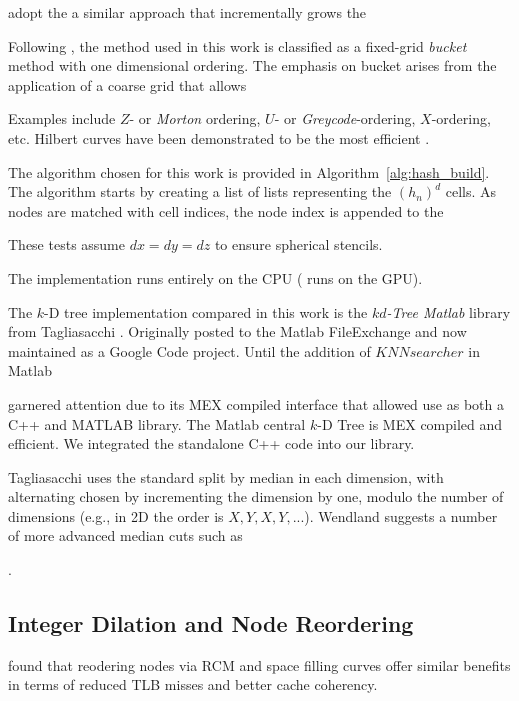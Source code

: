 \documentclass{report}
\begin{document}
\cite{Purcell2003} adopt the a similar approach that incrementally grows the 

Following \cite{Samet2005}, the method used in this work is classified as a fixed-grid \emph{bucket} method with one dimensional ordering. The emphasis on bucket arises from the application of a coarse grid that allows 

 Examples include $Z$- or \emph{Morton} ordering, $U$- or \emph{Greycode}-ordering, $X$-ordering, etc. Hilbert curves have been demonstrated to be the most efficient \cite{INREFS}. 

The algorithm chosen for this work is provided in Algorithm~\ref{alg:hash_build}. The algorithm starts by creating a list of lists representing the $(h_n)^d$ cells. As nodes are matched with cell indices, the node index is appended to the 



These tests assume $dx = dy = dz$ to ensure spherical stencils. 


The implementation runs entirely on the CPU (\cite{Krog2010} runs on the GPU). 


The $k$-D tree implementation compared in this work is the \emph{$kd$-Tree Matlab} library from Tagliasacchi \cite{TagliasacchiMFE,TagliasacchiGC}. Originally posted to the Matlab FileExchange and now maintained as a Google Code project. Until the addition of $KNNsearcher$ in Matlab 

garnered attention due to its MEX compiled interface that allowed use as both a C++ and MATLAB library. 
The Matlab central $k$-D Tree is MEX compiled and efficient. We integrated the standalone C++ code into our library.  

Tagliasacchi \cite{TagliasacchiGC} uses the standard split by median in each dimension, with alternating chosen by incrementing the dimension by one, modulo the number of dimensions (e.g., in 2D the order is $X, Y, X, Y, ...$). Wendland \cite{WendlandBook} suggests a number of more advanced median cuts such as 

\cite{TagliasacchiMFE}. 
\cite{MatlabKDTreeSearcher}








\subsection{Integer Dilation and Node Reordering}

\cite{MellorCrummey2001} found that reodering nodes via RCM and space filling curves offer similar benefits in terms of reduced TLB misses and better cache coherency. 
\end{document}
